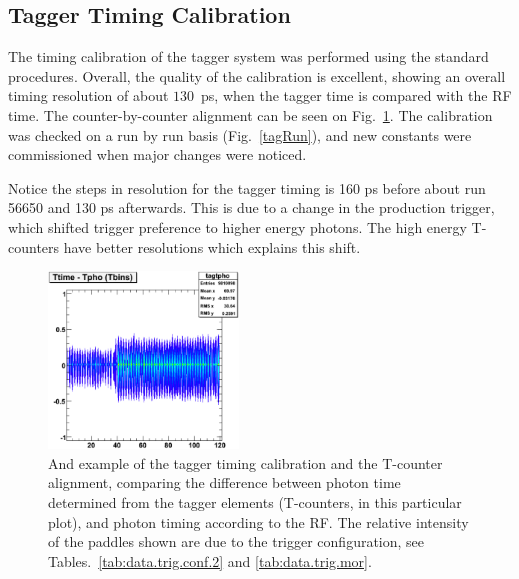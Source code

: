 \subsection{\label{sec:calib.tag}Tagger Timing Calibration}
The timing calibration of the tagger system was performed using the standard procedures. Overall, the quality of the calibration is excellent, showing an overall timing resolution of about $130$~ps, when the tagger time is compared with the RF time. The counter-by-counter alignment can be seen on Fig.~\ref{tagtpho}. The calibration was checked on a run by run basis (Fig.~\ref{tagRun}), and new constants were commissioned when major changes were noticed.

Notice the steps in resolution for the tagger timing is 160 ps before about run 56650 and 130 ps afterwards. This is due to a change in the production trigger, which shifted trigger preference to higher energy photons. The high energy T-counters have better resolutions which explains this shift.


\begin{figure}[htpb]
\begin{center}
 \includegraphics[width=0.45\textwidth]{figures/calib/tag/timing/tagtpho.eps}
  \caption{And example of the tagger timing calibration and the T-counter alignment, comparing  the difference between photon time determined from the tagger elements (T-counters, in this particular plot), and photon timing according to the RF. The relative intensity of the paddles shown are due to the trigger configuration, see Tables.~\ref{tab:data.trig.conf.2} and \ref{tab:data.trig.mor}.}
  \label{tagtpho}
  \end{center}
\end{figure}


